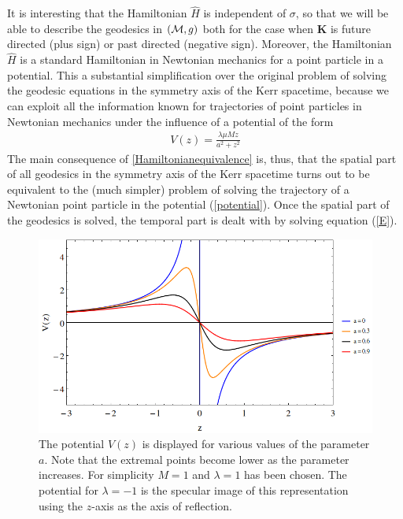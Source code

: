 \begin{Remark}\label{Remarksigma}
It is interesting that the  Hamiltonian 
$\hat{H}$ is independent of $\sigma$, so that we will be able
to describe the geodesics in 
$({\mathcal M},g)$
both for the case when $\bm{K}$ is future directed 
(plus sign) or past directed (negative sign). Moreover, the Hamiltonian
$\hat{H}$ is a standard Hamiltonian in Newtonian mechanics for a point particle 
in a potential. This a substantial simplification over the original
problem of solving the geodesic equations
in the symmetry axis of the Kerr spacetime, 
because we can exploit all the information known for trajectories of point
particles in Newtonian mechanics under the influence of a 
potential of the form
\begin{gather}\label{potential}
V(z)=\frac{ \lambda  \mu  M z}{a^2+z^2}
\end{gather}
The main consequence of \cref{Hamiltonianequivalence} is, thus, that 
the spatial part of all geodesics in the symmetry axis of the Kerr spacetime turns out to
be equivalent to the (much simpler) problem of solving the trajectory of a 
Newtonian
point particle in the potential (\cref{potential}). 
Once the spatial part of the geodesics is solved, the temporal part is dealt 
with
by solving equation (\ref{E}).
 \begin{figure}[hpt!]
\begin{center}
 \centerline{\includegraphics[width=\textwidth]{img/Chapter3/Potential.png}}
 \end{center}
 \caption{The potential $V(z)$ is displayed for various values of the parameter $a$. Note that the extremal points become lower as the parameter increases. For simplicity $M=1$ and $\lambda=1$ has been chosen. The potential for $\lambda=-1$ is the specular image of this representation using the $z$-axis as the axis of reflection.}
 \label{fig:Potentialeje}
\end{figure}  
\end{Remark}

